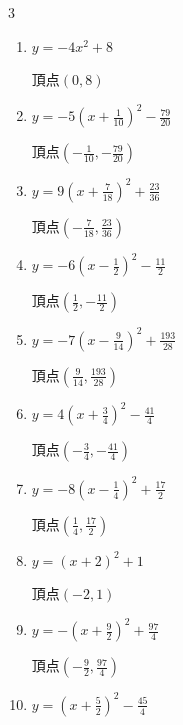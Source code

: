 \begin{multicols}{3}
\begin{enumerate}
        $\displaystyle 頂点\left( \frac{1}{9} , \frac{26}{9} \right)$

  \item $\displaystyle y=-4x^{2}+8$

        $\displaystyle 頂点\left( 0 , 8 \right)$

  \item $\displaystyle y=-5\left( x+\frac{1}{10}\right)^{2}-\frac{79}{20}$

        $\displaystyle 頂点\left( -\frac{1}{10} , -\frac{79}{20} \right)$

\columnbreak %

  \item $\displaystyle y=9\left( x+\frac{7}{18}\right)^{2}+\frac{23}{36}$

        $\displaystyle 頂点\left( -\frac{7}{18} , \frac{23}{36} \right)$

  \item $\displaystyle y=-6\left( x-\frac{1}{2}\right)^{2}-\frac{11}{2}$

        $\displaystyle 頂点\left( \frac{1}{2} , -\frac{11}{2} \right)$

  \item $\displaystyle y=-7\left( x-\frac{9}{14}\right)^{2}+\frac{193}{28}$

        $\displaystyle 頂点\left( \frac{9}{14} , \frac{193}{28} \right)$

  \item $\displaystyle y=4\left( x+\frac{3}{4}\right)^{2}-\frac{41}{4}$

        $\displaystyle 頂点\left( -\frac{3}{4} , -\frac{41}{4} \right)$

  \item $\displaystyle y=-8\left( x-\frac{1}{4}\right)^{2}+\frac{17}{2}$

        $\displaystyle 頂点\left( \frac{1}{4} , \frac{17}{2} \right)$

  \item $\displaystyle y=\left( x+2\right)^{2}+1$

        $\displaystyle 頂点\left( -2 , 1 \right)$

  \item $\displaystyle y=-\left( x+\frac{9}{2}\right)^{2}+\frac{97}{4}$

        $\displaystyle 頂点\left( -\frac{9}{2} , \frac{97}{4} \right)$

  \item $\displaystyle y=\left( x+\frac{5}{2}\right)^{2}-\frac{45}{4}$


\end{enumerate}
\end{multicols}
